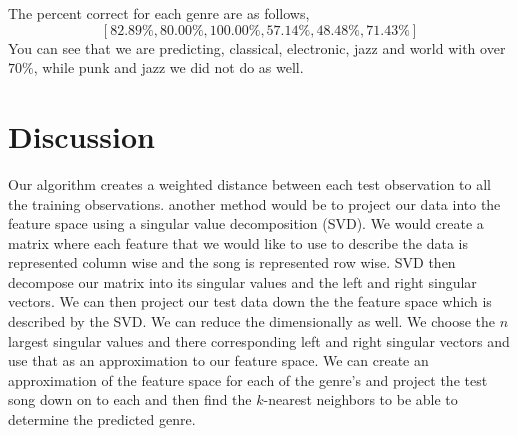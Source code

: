 \documentclass[12pt]{article}
\begin{document}
The percent correct for each genre are as follows,
\[ [82.89\%, 80.00\%, 100.00\%, 57.14\%, 48.48\%, 71.43\%] \]
You can see that we are predicting, classical, electronic, jazz  and world with over $70\%$, while punk and jazz we did not do as well. 




\section{Discussion}

Our algorithm creates a weighted distance between each test observation to all the training observations. another method would be to project our data into the feature space using a singular value decomposition (SVD). We would create a matrix where each feature that we would like to use to describe the data is represented column wise and the song is represented row wise. SVD then decompose our matrix into its singular values and the left and right singular vectors. We can then project our test data down the the feature space which is described by the SVD. We can reduce the dimensionally as well. We choose the $n$ largest singular values and there corresponding left and right singular vectors and use that as an approximation to our feature space. We can create an approximation of the feature space for each of the genre's and project the test song down on to each and then find the $k$-nearest neighbors to be able to determine the predicted genre. 




\end{document}
